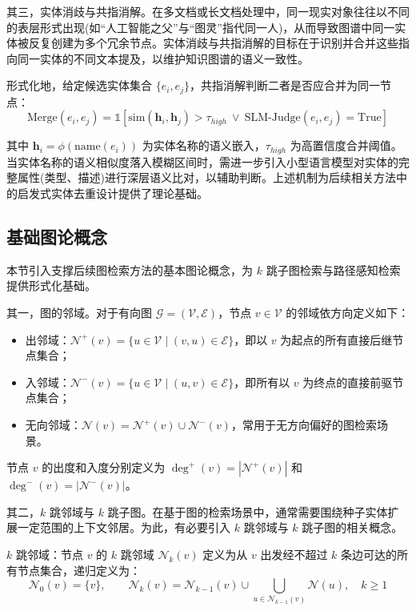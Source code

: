 \documentclass[promaster, vlined]{DissertUESTC}
\begin{document}
其三，实体消歧与共指消解。在多文档或长文档处理中，同一现实对象往往以不同的表层形式出现(如“人工智能之父”与“图灵”指代同一人)，从而导致图谱中同一实体被反复创建为多个冗余节点。实体消歧与共指消解的目标在于识别并合并这些指向同一实体的不同文本提及，以维护知识图谱的语义一致性。

形式化地，给定候选实体集合 $\{e_i, e_j\}$，共指消解判断二者是否应合并为同一节点：
\begin{equation}
\text{Merge}(e_i, e_j) = \mathbb{1}\left[\text{sim}(\mathbf{h}_i, \mathbf{h}_j) > \tau_{high}\ \lor\ \text{SLM-Judge}(e_i, e_j) = \text{True}\right]
\end{equation}

其中 $\mathbf{h}_i = \phi(\text{name}(e_i))$ 为实体名称的语义嵌入，$\tau_{high}$ 为高置信度合并阈值。当实体名称的语义相似度落入模糊区间时，需进一步引入小型语言模型对实体的完整属性(类型、描述)进行深层语义比对，以辅助判断。上述机制为后续相关方法中的启发式实体去重设计提供了理论基础。

\subsection{基础图论概念}

本节引入支撑后续图检索方法的基本图论概念，为 $k$ 跳子图检索与路径感知检索提供形式化基础。

其一，图的邻域。对于有向图 $\mathcal{G} = (\mathcal{V}, \mathcal{E})$，节点 $v \in \mathcal{V}$ 的邻域依方向定义如下：

\begin{itemize}
\item 出邻域：$\mathcal{N}^{+}(v) = \{u \in \mathcal{V} \mid (v, u) \in \mathcal{E}\}$，即以 $v$ 为起点的所有直接后继节点集合；
\item 入邻域：$\mathcal{N}^{-}(v) = \{u \in \mathcal{V} \mid (u, v) \in \mathcal{E}\}$，即所有以 $v$ 为终点的直接前驱节点集合；
    \item 无向邻域：$\mathcal{N}(v) = \mathcal{N}^{+}(v) \cup \mathcal{N}^{-}(v)$，常用于无方向偏好的图检索场景。
\end{itemize}

节点 $v$ 的出度和入度分别定义为 $\deg^{+}(v) = |\mathcal{N}^{+}(v)|$ 和 $\deg^{-}(v) = |\mathcal{N}^{-}(v)|$。

其二，$k$ 跳邻域与 $k$ 跳子图。在基于图的检索场景中，通常需要围绕种子实体扩展一定范围的上下文邻居。为此，有必要引入 $k$ 跳邻域与 $k$ 跳子图的相关概念。

$k$ 跳邻域：节点 $v$ 的 $k$ 跳邻域 $\mathcal{N}_k(v)$ 定义为从 $v$ 出发经不超过 $k$ 条边可达的所有节点集合，递归定义为：
\begin{equation}
\mathcal{N}_0(v) = \{v\}, \qquad \mathcal{N}_k(v) = \mathcal{N}_{k-1}(v) \cup \bigcup_{u \in \mathcal{N}_{k-1}(v)} \mathcal{N}(u), \quad k \geq 1
\end{equation}
\end{document}
